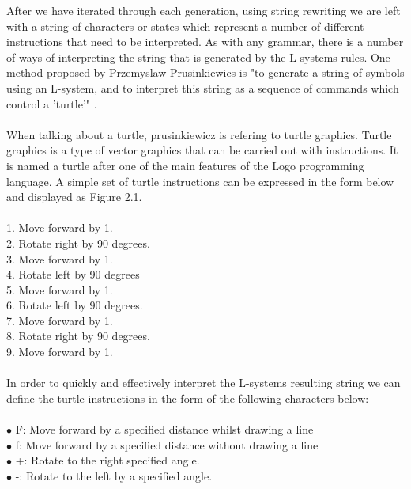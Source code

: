 After we have iterated through each generation, using string rewriting we are left with a string of characters or states which represent a number of different instructions that need to be interpreted. As with any grammar, there is a number of ways of interpreting the string that is generated by the L-systems rules. One method proposed by Przemyslaw Prusinkiewics is "to generate a string of symbols using an L-system, and to interpret this string as a sequence of commands which control a 'turtle'" \cite{prusinkiewicz1986graphical}.\\
\\
When talking about a turtle, prusinkiewicz is refering to turtle graphics. Turtle graphics is a type of vector graphics that can be carried out with instructions. It is named a turtle after one of the main features of the Logo programming language. A simple set of turtle instructions can be expressed in the form below and displayed as Figure 2.1.\\
\\
1. Move forward by 1.\\
2. Rotate right by 90 degrees.\\
3. Move forward by 1.\\
4. Rotate left by 90 degrees \\
5. Move forward by 1. \\
6. Rotate left by 90 degrees. \\
7. Move forward by 1. \\
8. Rotate right by 90 degrees. \\
9. Move forward by 1.\\
\\
In order to quickly and effectively interpret the L-systems resulting string we can define the turtle instructions in the form of the following characters below:\\
\\
$\bullet$ F: 				\hspace{10mm} 		Move forward by a specified distance whilst drawing a line \\
$\bullet$ f: 				\hspace{10mm} 		Move forward by a specified distance without drawing a line \\
$\bullet$ +: 				\hspace{10mm} 		Rotate to the right specified angle. \\
$\bullet$ -: 				\hspace{10mm} 		Rotate to the left by a specified angle.  \\
